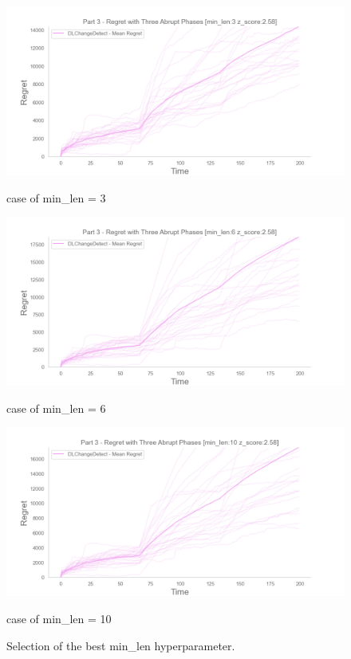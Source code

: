 \begin{figure}[!htb]
    \centering

    \includegraphics[width=\linewidth]{images/part3_min-len3_z_score2_58.png}
    \caption{case of min\_len = 3}\label{minlen3}
    \endminipage\hfill
    \includegraphics[width=\linewidth]{images/part3_min-len6_z_score2_58.png}
    \caption{case of min\_len = 6}\label{minlen6}
    \endminipage\hfill
    \includegraphics[width=\linewidth]{images/part3_min-len10_z_score2_58.png}
    \caption{case of min\_len = 10}\label{minlen10}
    \endminipage\hfill

    \caption{Selection of the best min\_len hyperparameter.}
    \label{minLenValidationFig}
\end{figure}



